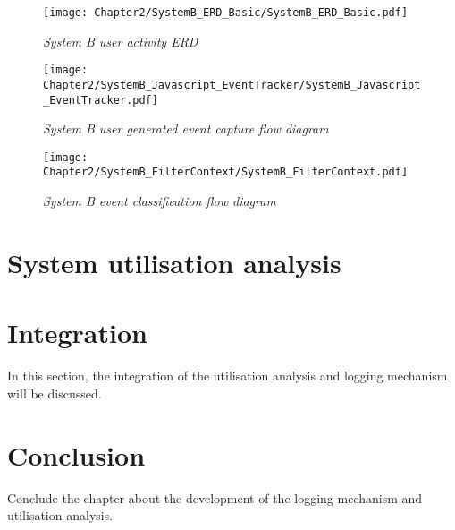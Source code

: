 \begin{figure}[!htb] %
	\centering %
	\texttt{[image: Chapter2/SystemB\_ERD\_Basic/SystemB\_ERD\_Basic.pdf]}
	\caption[System B user activity ERD]
	{\textit{System B user activity ERD}}\label{fig:ch2_SystemB_Basic_ERD}
\end{figure}

\clearpage

\begin{figure}[!htb]
	\centering
	\texttt{[image: Chapter2/SystemB\_Javascript\_EventTracker/SystemB\_Javascript\_EventTracker.pdf]}
	\caption[System B user generated event capture]
	{\textit{System B user generated event capture flow diagram}}\label{fig:CH2_SystemB_EventCapture}
\end{figure}

\clearpage

\begin{figure}[!htb]
	\centering
	\texttt{[image: Chapter2/SystemB\_FilterContext/SystemB\_FilterContext.pdf]}
	\caption[System B event classification]
	{\textit{System B event classification flow diagram}}\label{fig:CH2_SystemB_FilterContext}
\end{figure}

\clearpage

\section{System utilisation analysis}

\section{Integration}
In this section, the integration of the utilisation analysis and logging mechanism will be discussed.

\section{Conclusion}
Conclude the chapter about the development of the logging mechanism and utilisation analysis.